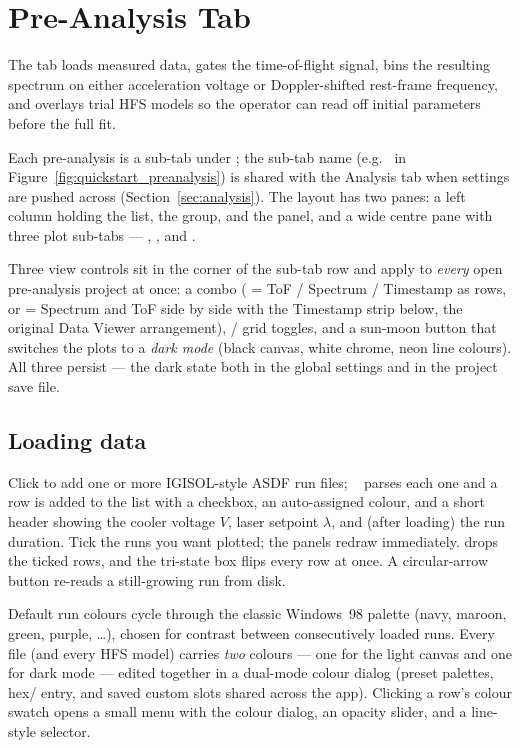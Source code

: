 \section{Pre-Analysis Tab}
\label{sec:preanalysis}

The  tab loads measured data, gates the
time-of-flight signal, bins the resulting spectrum on either
acceleration voltage or Doppler-shifted rest-frame frequency, and
overlays trial HFS models so the operator can read off initial
parameters before the full fit.

Each pre-analysis is a sub-tab under ; the
sub-tab name (e.g.\  in
Figure~\ref{fig:quickstart_preanalysis}) is shared with the Analysis
tab when settings are pushed across (Section~\ref{sec:analysis}). The
layout has two panes: a left column holding the 
list, the  group, and the  panel,
and a wide centre pane with three plot sub-tabs --- ,
, and .

Three view controls sit in the corner of the sub-tab row and apply to
\emph{every} open pre-analysis project at once: a  combo
( = ToF / Spectrum / Timestamp as rows, or
 = Spectrum and ToF side by side with the
Timestamp strip below, the original Data Viewer arrangement),
 /  grid toggles, and a sun-moon button that switches
the plots to a \emph{dark mode} (black canvas, white chrome, neon
line colours). All three persist --- the dark state both in the
global settings and in the project save file.

\subsection{Loading data}

Click  to add one or more IGISOL-style ASDF run files;
~\cite{clstools} parses each one and a row is added to
the  list with a checkbox, an auto-assigned colour,
and a short header showing the cooler voltage $V$, laser setpoint
$\lambda$, and (after loading) the run duration. Tick the runs you
want plotted; the panels redraw immediately. 
drops the ticked rows, and the tri-state  box flips
every row at once. A circular-arrow button re-reads a still-growing
run from disk.

Default run colours cycle through the classic Windows~98 palette
(navy, maroon, green, purple, \dots), chosen for contrast between
consecutively loaded runs. Every file (and every HFS model) carries
\emph{two} colours --- one for the light canvas and one for dark
mode --- edited together in a dual-mode colour dialog (preset
palettes, hex/ entry, and saved custom slots shared
across the app). Clicking a row's colour swatch opens a small menu
with the colour dialog, an opacity slider, and a line-style selector.

